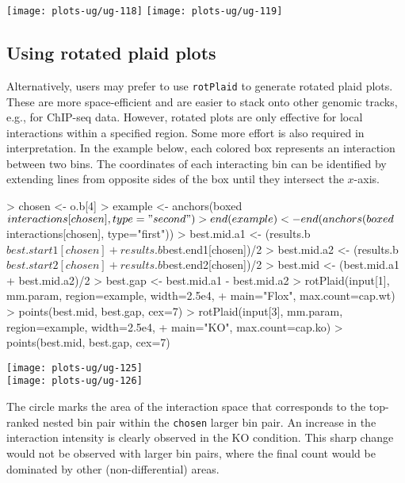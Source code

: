\documentclass[12pt]{report}
\renewenvironment{Schunk}{\vspace{0pt}}{\vspace{0pt}}
\newcommand{\code}[1]{{\small\texttt{#1}}}
\begin{document}
\begin{center}
\texttt{[image: plots-ug/ug-118]}
\texttt{[image: plots-ug/ug-119]}
\end{center}

\subsection{Using rotated plaid plots}
Alternatively, users may prefer to use \code{rotPlaid} to generate rotated plaid plots.
These are more space-efficient and are easier to stack onto other genomic tracks, e.g., for ChIP-seq data.
However, rotated plots are only effective for local interactions within a specified region.
Some more effort is also required in interpretation.
In the example below, each colored box represents an interaction between two bins. 
The coordinates of each interacting bin can be identified by extending lines from opposite sides of the box until they intersect the $x$-axis.





\begin{Schunk}
\begin{Sinput}
> chosen <- o.b[4]
> example <- anchors(boxed$interactions[chosen], type="second")
> end(example) <- end(anchors(boxed$interactions[chosen], type="first"))
> best.mid.a1 <- (results.b$best.start1[chosen]+results.b$best.end1[chosen])/2
> best.mid.a2 <- (results.b$best.start2[chosen]+results.b$best.end2[chosen])/2
> best.mid <- (best.mid.a1 + best.mid.a2)/2
> best.gap <- best.mid.a1 - best.mid.a2
> rotPlaid(input[1], mm.param, region=example, width=2.5e4, 
+     main="Flox", max.count=cap.wt)
> points(best.mid, best.gap, cex=7) 
> rotPlaid(input[3], mm.param, region=example, width=2.5e4,
+     main="KO", max.count=cap.ko)
> points(best.mid, best.gap, cex=7) 
\end{Sinput}
\end{Schunk}

\begin{center}
\texttt{[image: plots-ug/ug-125]}
\\
\texttt{[image: plots-ug/ug-126]}
\end{center}

The circle marks the area of the interaction space that corresponds to the top-ranked nested bin pair within the \code{chosen} larger bin pair.
An increase in the interaction intensity is clearly observed in the KO condition.
This sharp change would not be observed with larger bin pairs, where the final count would be dominated by other (non-differential) areas.
\end{document}
